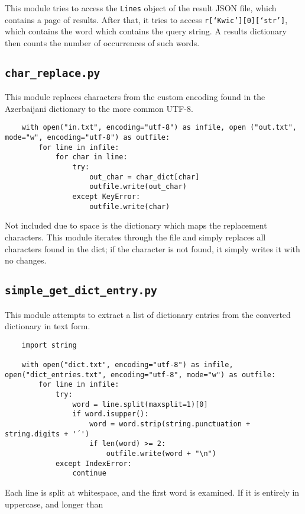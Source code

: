 \documentclass{article}      %
\begin{document}
	This module tries to access the \texttt{Lines} object of the result JSON file, which contains a page of results. After that, it tries to access \texttt{r[`Kwic'][0][`str']}, which contains the word which contains the query string. A results dictionary then counts the number of occurrences of such words.
	
	\subsection{\texttt{char\_replace.py}}
	
	This module replaces characters from the custom encoding found in the Azerbaijani dictionary to the more common UTF-8.
	
	\begin{verbatim}
	with open("in.txt", encoding="utf-8") as infile, open ("out.txt", mode="w", encoding="utf-8") as outfile:
		for line in infile:
			for char in line:
				try:
					out_char = char_dict[char]
					outfile.write(out_char)
				except KeyError:
					outfile.write(char)    
	\end{verbatim}
	
	Not included due to space is the dictionary which maps the replacement characters. This module iterates through the file and simply replaces all characters found in the dict; if the character is not found, it simply writes it with no changes.
	
	\subsection{\texttt{simple\_get\_dict\_entry.py}}
	
	This module attempts to extract a list of dictionary entries from the converted dictionary in text form.
	
	\begin{verbatim}
	import string
	
	with open("dict.txt", encoding="utf-8") as infile, open("dict_entries.txt", encoding="utf-8", mode="w") as outfile:
		for line in infile:
			try:
				word = line.split(maxsplit=1)[0]
				if word.isupper():
					word = word.strip(string.punctuation + string.digits + '´')
					if len(word) >= 2:
						outfile.write(word + "\n")
			except IndexError:
				continue
	\end{verbatim}
	
	Each line is split at whitespace, and the first word is examined. If it is entirely in uppercase, and longer than 
	
	
\end{document}
